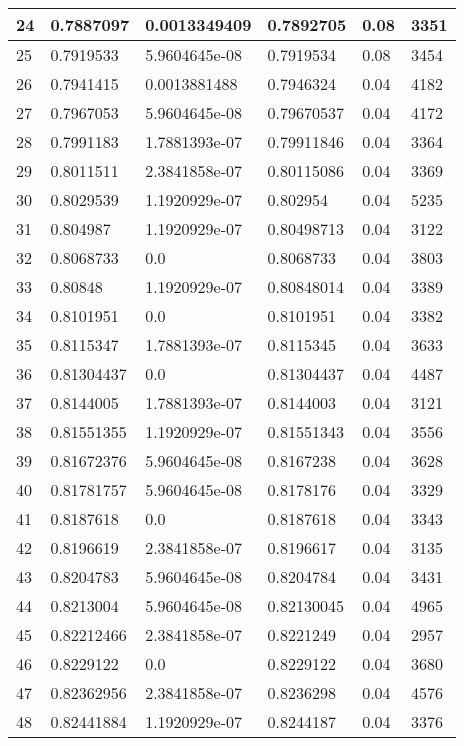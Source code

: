 \begin{longtable}{|l|l|l|l|l|l|}
24 & 0.7887097 & 0.0013349409 & 0.7892705 & 0.08 & 3351 \\ \hline 
25 & 0.7919533 & 5.9604645e-08 & 0.7919534 & 0.08 & 3454 \\ \hline 
26 & 0.7941415 & 0.0013881488 & 0.7946324 & 0.04 & 4182 \\ \hline 
27 & 0.7967053 & 5.9604645e-08 & 0.79670537 & 0.04 & 4172 \\ \hline 
28 & 0.7991183 & 1.7881393e-07 & 0.79911846 & 0.04 & 3364 \\ \hline 
29 & 0.8011511 & 2.3841858e-07 & 0.80115086 & 0.04 & 3369 \\ \hline 
30 & 0.8029539 & 1.1920929e-07 & 0.802954 & 0.04 & 5235 \\ \hline 
31 & 0.804987 & 1.1920929e-07 & 0.80498713 & 0.04 & 3122 \\ \hline 
32 & 0.8068733 & 0.0 & 0.8068733 & 0.04 & 3803 \\ \hline 
33 & 0.80848 & 1.1920929e-07 & 0.80848014 & 0.04 & 3389 \\ \hline 
34 & 0.8101951 & 0.0 & 0.8101951 & 0.04 & 3382 \\ \hline 
35 & 0.8115347 & 1.7881393e-07 & 0.8115345 & 0.04 & 3633 \\ \hline 
36 & 0.81304437 & 0.0 & 0.81304437 & 0.04 & 4487 \\ \hline 
37 & 0.8144005 & 1.7881393e-07 & 0.8144003 & 0.04 & 3121 \\ \hline 
38 & 0.81551355 & 1.1920929e-07 & 0.81551343 & 0.04 & 3556 \\ \hline 
39 & 0.81672376 & 5.9604645e-08 & 0.8167238 & 0.04 & 3628 \\ \hline 
40 & 0.81781757 & 5.9604645e-08 & 0.8178176 & 0.04 & 3329 \\ \hline 
41 & 0.8187618 & 0.0 & 0.8187618 & 0.04 & 3343 \\ \hline 
42 & 0.8196619 & 2.3841858e-07 & 0.8196617 & 0.04 & 3135 \\ \hline 
43 & 0.8204783 & 5.9604645e-08 & 0.8204784 & 0.04 & 3431 \\ \hline 
44 & 0.8213004 & 5.9604645e-08 & 0.82130045 & 0.04 & 4965 \\ \hline 
45 & 0.82212466 & 2.3841858e-07 & 0.8221249 & 0.04 & 2957 \\ \hline 
46 & 0.8229122 & 0.0 & 0.8229122 & 0.04 & 3680 \\ \hline 
47 & 0.82362956 & 2.3841858e-07 & 0.8236298 & 0.04 & 4576 \\ \hline 
48 & 0.82441884 & 1.1920929e-07 & 0.8244187 & 0.04 & 3376 \\ \hline 

\end{longtable}
